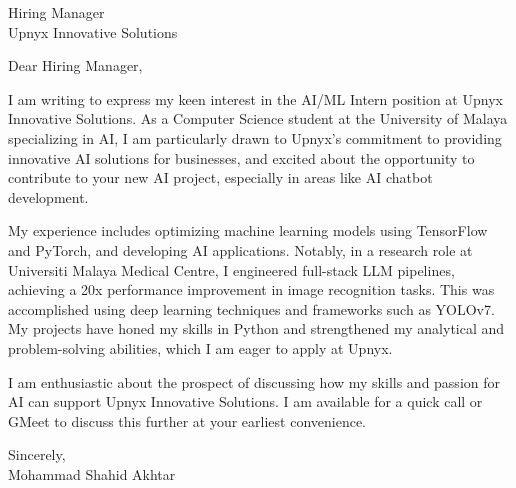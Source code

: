 \documentclass[11pt]{letter}
\date{\today}
\begin{document}
\begin{letter}{Hiring Manager\\
Upnyx Innovative Solutions\\
 }

\opening{Dear Hiring Manager,}

I am writing to express my keen interest in the AI/ML Intern position at Upnyx Innovative Solutions. As a Computer Science student at the University of Malaya specializing in AI, I am particularly drawn to Upnyx's commitment to providing innovative AI solutions for businesses, and excited about the opportunity to contribute to your new AI project, especially in areas like AI chatbot development.

My experience includes optimizing machine learning models using TensorFlow and PyTorch, and developing AI applications.  Notably, in a research role at Universiti Malaya Medical Centre, I engineered full-stack LLM pipelines, achieving a 20x performance improvement in image recognition tasks.  This was accomplished using deep learning techniques and frameworks such as YOLOv7. My projects have honed my skills in Python and strengthened my analytical and problem-solving abilities, which I am eager to apply at Upnyx.

I am enthusiastic about the prospect of discussing how my skills and passion for AI can support Upnyx Innovative Solutions.  I am available for a quick call or GMeet to discuss this further at your earliest convenience.

\vspace{0.4cm}
\begin{flushleft}
Sincerely,\\
[1.5ex]
Mohammad Shahid Akhtar
\end{flushleft}

\end{letter}
\end{document}
